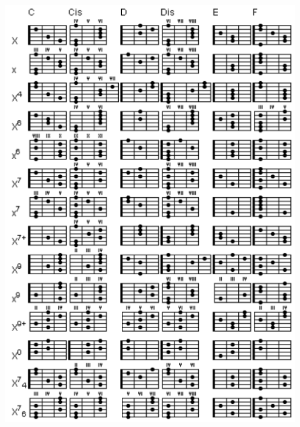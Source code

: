 \documentclass[a5paper, 10pt]{book}
\begin{document}
\newpage
~\\
\includegraphics[width=0.95\textwidth, center]{chordchart1.png}\\
\newpage
~\\
\end{document}
